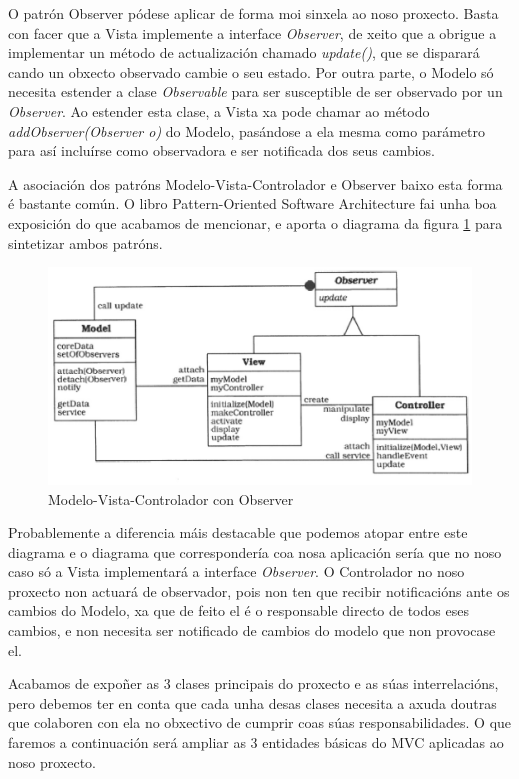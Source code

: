 O patrón Observer pódese aplicar de forma moi sinxela ao noso proxecto. Basta con facer que a Vista implemente a interface \textit{Observer}, de xeito que a obrigue a implementar un método de actualización chamado \textit{update()}, que se disparará cando un obxecto observado cambie o seu estado. Por outra parte, o Modelo só necesita estender a clase \textit{Observable} para ser susceptible de ser observado por un \textit{Observer}. Ao estender esta clase, a Vista xa pode chamar ao método \textit{addObserver(Observer o)} do Modelo, pasándose a ela mesma como parámetro para así incluírse como observadora e ser notificada dos seus cambios.

A asociación dos patróns Modelo-Vista-Controlador e Observer baixo esta forma é bastante común. O libro Pattern-Oriented Software Architecture \cite{pattern-oriented-software-architecture} fai unha boa exposición do que acabamos de mencionar, e aporta o diagrama da figura \ref{MVC-observer} para sintetizar ambos patróns.

\begin{figure}
\centering
\includegraphics[width=\textwidth,height=\textheight,keepaspectratio]{figuras/MVC-observer}
\caption{Modelo-Vista-Controlador con Observer}
\label{MVC-observer}
\end{figure}

Probablemente a diferencia máis destacable que podemos atopar entre este diagrama e o diagrama que correspondería coa nosa aplicación sería que no noso caso só a Vista implementará a interface \textit{Observer}. O Controlador no noso proxecto non actuará de observador, pois non ten que recibir notificacións ante os cambios do Modelo, xa que de feito el é o responsable directo de todos eses cambios, e non necesita ser notificado de cambios do modelo que non provocase el.

Acabamos de expoñer as 3 clases principais do proxecto e as súas interrelacións, pero debemos ter en conta que cada unha desas clases necesita a axuda doutras que colaboren con ela no obxectivo de cumprir coas súas responsabilidades. O que faremos a continuación será ampliar as 3 entidades básicas do MVC aplicadas ao noso proxecto.

